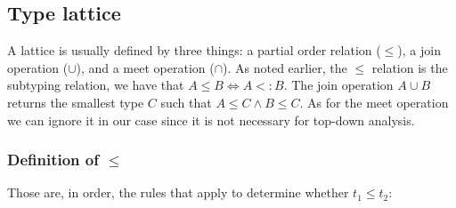 \documentclass[a4paper]{article}
\begin{document}
\subsection{Type lattice}
A lattice is usually defined by three things: a partial order relation
($\leq$), a join operation ($\cup$), and a meet operation ($\cap$). As noted
earlier, the $\leq$ relation is the subtyping relation, we have that $A \leq B
\Leftrightarrow A <: B$. The join operation $A \cup B$ returns the smallest
type $C$ such that $A \leq C \wedge B \leq C$. As for the meet operation
we can ignore it in our case since it is not necessary for top-down analysis.

\subsubsection{Definition of $\leq$}
Those are, in order, the rules that apply to determine whether $t_1 \leq t_2$:
\end{document}
